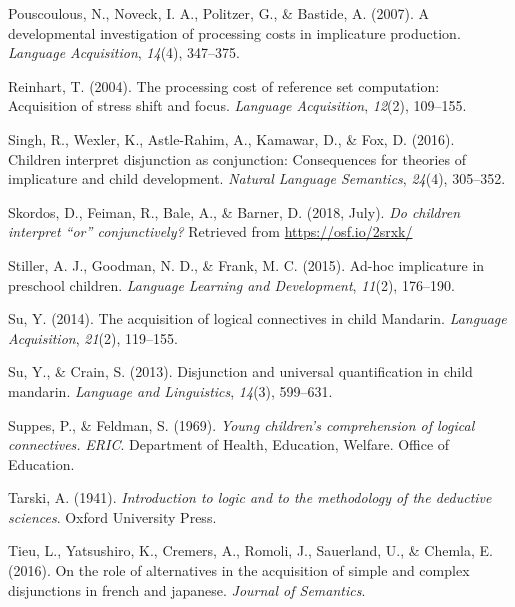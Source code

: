 \documentclass[floatsintext,man]{apa6}
\theoremstyle{definition}
\theoremstyle{definition}
\theoremstyle{definition}
\theoremstyle{remark}
\begin{document}
\hypertarget{ref-pouscoulous2007developmental}{}
Pouscoulous, N., Noveck, I. A., Politzer, G., \& Bastide, A. (2007). A
developmental investigation of processing costs in implicature
production. \emph{Language Acquisition}, \emph{14}(4), 347--375.

\hypertarget{ref-reinhart2004processing}{}
Reinhart, T. (2004). The processing cost of reference set computation:
Acquisition of stress shift and focus. \emph{Language Acquisition},
\emph{12}(2), 109--155.

\hypertarget{ref-Singh2016}{}
Singh, R., Wexler, K., Astle-Rahim, A., Kamawar, D., \& Fox, D. (2016).
Children interpret disjunction as conjunction: Consequences for theories
of implicature and child development. \emph{Natural Language Semantics},
\emph{24}(4), 305--352.

\hypertarget{ref-skordosEtal2018}{}
Skordos, D., Feiman, R., Bale, A., \& Barner, D. (2018, July). \emph{Do
children interpret ``or'' conjunctively?} Retrieved from
\url{https://osf.io/2srxk/}

\hypertarget{ref-stiller2015ad}{}
Stiller, A. J., Goodman, N. D., \& Frank, M. C. (2015). Ad-hoc
implicature in preschool children. \emph{Language Learning and
Development}, \emph{11}(2), 176--190.

\hypertarget{ref-su2014acquisition}{}
Su, Y. (2014). The acquisition of logical connectives in child Mandarin.
\emph{Language Acquisition}, \emph{21}(2), 119--155.

\hypertarget{ref-su2013disjunction}{}
Su, Y., \& Crain, S. (2013). Disjunction and universal quantification in
child mandarin. \emph{Language and Linguistics}, \emph{14}(3), 599--631.

\hypertarget{ref-suppes1969young}{}
Suppes, P., \& Feldman, S. (1969). \emph{Young children's comprehension
of logical connectives.} \emph{ERIC}. Department of Health, Education,
Welfare. Office of Education.

\hypertarget{ref-tarski1941logic}{}
Tarski, A. (1941). \emph{Introduction to logic and to the methodology of
the deductive sciences}. Oxford University Press.

\hypertarget{ref-tieu2016}{}
Tieu, L., Yatsushiro, K., Cremers, A., Romoli, J., Sauerland, U., \&
Chemla, E. (2016). On the role of alternatives in the acquisition of
simple and complex disjunctions in french and japanese. \emph{Journal of
Semantics}.
\end{document}
